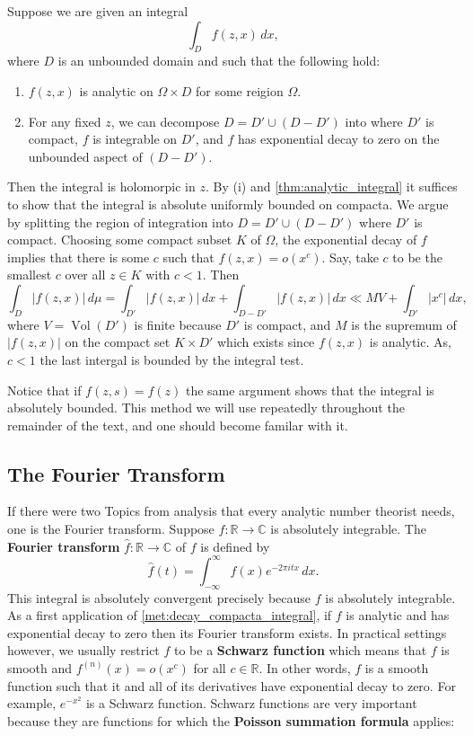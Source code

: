 \documentclass[12pt]{book}
\theoremstyle{definition}\newframedtheorem{method}{Method}
\newcommand{\R}{\mathbb{R}}
\newcommand{\C}{\mathbb{C}}
\newcommand{\W}{\Omega}
\newcommand{\x}{\times}
\newcommand{\<}{\langle}
\renewcommand{\>}{\rangle}
\DeclareMathOperator{\Vol}{\mathrm{Vol}}
\begin{document}
      \begin{method}\label{met:decay_compacta_integral}
        Suppose we are given an integral
        \[
          \int_{D}f(z,x)\,dx,
        \]
        where $D$ is an unbounded domain and such that the following hold:
        \begin{enumerate}[label=(\roman*)]
          \item $f(z,x)$ is analytic on $\W \x D$ for some reigion $\W$.
          \item For any fixed $z$, we can decompose $D = D' \cup (D-D')$ into where $D'$ is compact, $f$ is integrable on $D'$, and $f$ has exponential decay to zero on the unbounded aspect of $(D-D')$.
        \end{enumerate}
        Then the integral is holomorpic in $z$. By (i) and \cref{thm:analytic_integral} it suffices to show that the integral is absolute uniformly bounded on compacta. We argue by splitting the region of integration into $D = D' \cup (D-D')$ where $D'$ is compact. Choosing some compact subset $K$ of $\W$, the exponential decay of $f$ implies that there is some $c$ such that $f(z,x) = o\left(x^{c}\right)$. Say, take $c$ to be the smallest $c$ over all $z \in K$ with $c < 1$. Then
        \[
          \int_{D}|f(z,x)|\,d\mu = \int_{D'}|f(z,x)|\,dx+\int_{D-D'}|f(z,x)|\,dx \ll MV+\int_{D'}\left|x^{c}\right|\,dx,
        \]
        where $V = \Vol(D')$ is finite because $D'$ is compact, and $M$ is the supremum of $|f(z,x)|$ on the compact set $K \x D'$ which exists since $f(z,x)$ is analytic. As, $c < 1$ the last intergal is bounded by the integral test.
      \end{method}

      Notice that if $f(z,s) = f(z)$ the same argument shows that the integral is absolutely bounded. This method we will use repeatedly throughout the remainder of the text, and one should become familar with it.
    \subsection*{The Fourier Transform}
      If there were two Topics from analysis that every analytic number theorist needs, one is the Fourier transform. Suppose $f:\R \to \C$ is absolutely integrable. The \textbf{Fourier transform} $\hat{f}:\R \to \C$ of $f$ is defined by
      \[
        \hat{f}(t) = \int_{-\infty}^{\infty}f(x)e^{-2\pi itx}\,dx.
      \]
      This integral is absolutely convergent precisely because $f$ is absolutely integrable. As a first application of \cref{met:decay_compacta_integral}, if $f$ is analytic and has exponential decay to zero then its Fourier transform exists. In practical settings however, we usually restrict $f$ to be a \textbf{Schwarz function} which means that $f$ is smooth and $f^{(n)}(x) = o(x^{c})$ for all $c \in \R$. In other words, $f$ is a smooth function such that it and all of its derivatives have exponential decay to zero. For example, $e^{-x^{2}}$ is a Schwarz function. Schwarz functions are very important because they are functions for which the \textbf{Poisson summation formula} applies:
\end{document}
